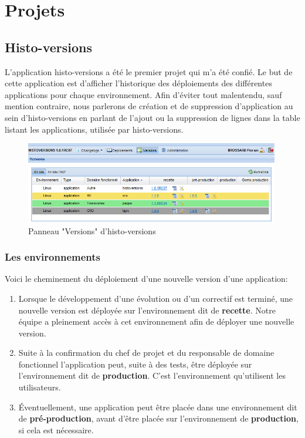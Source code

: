 \documentclass[12pt]{report}
\begin{document}
    \chapter{Projets}
    
    \section{Histo-versions}
    L'application histo-versions a été le premier projet qui m'a été confié. Le but de cette application est d'afficher l'historique des déploiements des différentes applications pour chaque environnement. Afin d'éviter tout malentendu, sauf mention contraire, nous parlerons de création et de suppression d'application au sein d'histo-versions en parlant de l'ajout ou la suppression de lignes dans la table listant les applications, utilisée par histo-versions.
    
    \begin{figure}[ht]
        \centering
        \includegraphics[width=0.99\textwidth]{img/HV_Panel_versions.png}
        \caption{Panneau "Versions" d'histo-versions}
        \label{fig:histoversions_versions}
    \end{figure}
    
    \newpage
    
    \subsection{Les environnements}
    Voici le cheminement du déploiement d'une nouvelle version d'une application:\vspace{-1em}
    \begin{enumerate}
        \item Lorsque le développement d'une évolution ou d'un correctif est terminé, une nouvelle version est déployée sur l'environnement dit de \textbf{recette}. Notre équipe a pleinement accès à cet environnement afin de déployer une nouvelle version.
        \item Suite à la confirmation du chef de projet et du responsable de domaine fonctionnel l'application peut, suite à des tests, être déployée sur l'environnement dit de \textbf{production}. C'est l'environnement qu'utilisent les utilisateurs.
        \item Éventuellement, une application peut être placée dans une environnement dit de \textbf{pré-production}, avant d'être placée sur l'environnement de \textbf{production}, si cela est nécessaire.
    \end{enumerate}
    
\end{document}
